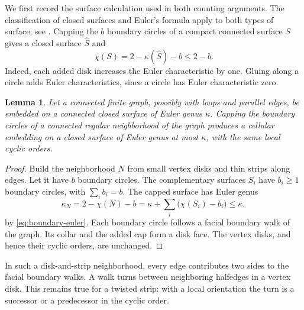 \documentclass[11pt]{article}
\newtheorem{lemma}[theorem]{Lemma}
\theoremstyle{remark}
\begin{document}
We first record the surface calculation used in both counting arguments.
The classification of closed surfaces and Euler's formula apply to both
types of surface; see \cite[Corollary 6.4 and Theorem 6.5]{Erickson}.
Capping the $b$ boundary circles of a compact connected surface $S$ gives a
closed surface $\widehat S$ and
\begin{equation}\label{eq:boundary-euler}
\chi(S)=2-\kappa(\widehat S)-b\le2-b.
\end{equation}
Indeed, each added disk increases the Euler characteristic by one.
Gluing along a circle adds Euler characteristics, since a circle has
Euler characteristic zero.

\begin{lemma}\label{lem:cap}
Let a connected finite graph, possibly with loops and parallel edges, be
embedded on a connected closed surface of Euler
genus $\kappa$. Capping the boundary circles of a connected regular
neighborhood of the graph produces a cellular embedding on a closed
surface of Euler genus at most $\kappa$, with the same local cyclic orders.
\end{lemma}
\begin{proof}
Build the neighborhood $N$ from small vertex disks and thin strips along
edges. Let it have $b$ boundary circles. The complementary surfaces $S_i$
have $b_i\ge1$ boundary circles, with $\sum_i b_i=b$. The capped surface
has Euler genus
\[
\kappa_N=2-\chi(N)-b
 =\kappa+\sum_i\bigl(\chi(S_i)-b_i\bigr)\le\kappa,
\]
by \eqref{eq:boundary-euler}. Each boundary circle follows a facial boundary
walk of the graph. Its collar and the added cap form a disk face.
The vertex disks, and hence their cyclic orders, are unchanged.
\end{proof}

In such a disk-and-strip neighborhood, every edge contributes two sides
to the facial boundary walks. A walk turns between neighboring halfedges
in a vertex disk. This remains true for a twisted strip: with a local
orientation the turn is a successor or a predecessor in the cyclic order.
\end{document}
